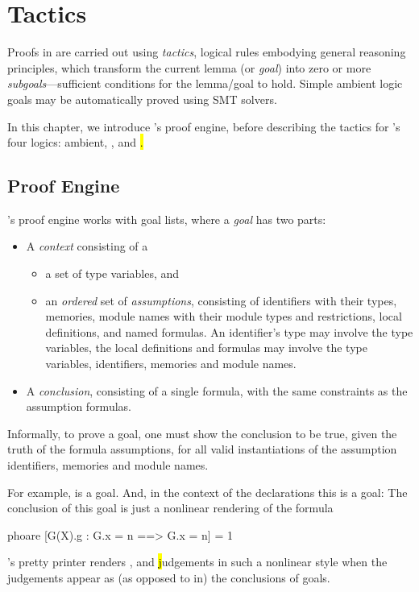 \chapter{Tactics}
\label{chap:tactics}

Proofs in \EasyCrypt are carried out using \emph{tactics}, logical
rules embodying general reasoning principles, which transform the
current lemma (or \emph{goal}) into zero or more
\emph{subgoals}---sufficient conditions for the lemma/goal to
hold. Simple ambient logic goals may be automatically proved using SMT
solvers.

In this chapter, we introduce \EasyCrypt's proof engine, before
describing the tactics for \EasyCrypt's four logics: ambient, \prhl,
\phl and \hl.

\section{Proof Engine}

\EasyCrypt's proof engine works with goal lists, where a \emph{goal}
has two parts:
\begin{itemize}
\item A \emph{context} consisting of a
  \begin{itemize}
  \item a set of type variables, and

  \item an \emph{ordered} set of \emph{assumptions}, consisting of
    identifiers with their types, memories, module names with their
    module types and restrictions, local definitions, and named
    formulas. An identifier's type may involve the type variables, the
    local definitions and formulas may involve the type variables,
    identifiers, memories and module names.
  \end{itemize}

\item A \emph{conclusion}, consisting of a single formula, with
  the same constraints as the assumption formulas.
\end{itemize}
Informally, to prove a goal, one must show the conclusion to be true,
given the truth of the formula assumptions, for all valid instantiations
of the assumption identifiers, memories and module names.

For example,
is a goal.
And, in the context of the declarations
this is a goal:
The conclusion of this goal is just a nonlinear rendering of the formula
\begin{easycrypt}{}{}
phoare [G(X).g : G.x = n ==> G.x = n] = 1%
\end{easycrypt}
\EasyCrypt's pretty printer renders \prhl, \phl and \hl judgements
in such a nonlinear style when the judgements appear as
(as opposed to in) the conclusions of goals.


